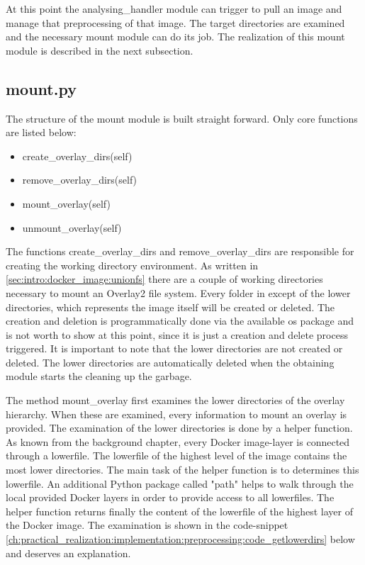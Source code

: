 

At this point the analysing\_handler module can trigger to pull an image and manage that preprocessing of that image. The target directories are examined and the necessary mount module can do its job. The realization of this mount module is described in the next subsection.	

\subsection{mount.py}	
\label{ch:practical_realization:implementation:mount}
The structure of the mount module is built straight forward. Only core functions are listed below:
\begin{itemize}
\item create\_overlay\_dirs(self)
\item remove\_overlay\_dirs(self)
\item mount\_overlay(self)
\item unmount\_overlay(self)
\end{itemize}
The functions create\_overlay\_dirs and remove\_overlay\_dirs are responsible for creating the working directory environment. As written in \ref{sec:intro:docker_image:unionfs} there are a couple of working directories necessary to mount an Overlay2 file system.
Every folder in except of the lower directories, which represents the image itself will be created or deleted. The creation and deletion is programmatically done via the available os package and is not worth to show at this point, since it is just a creation and delete process triggered. It is important to note that the lower directories are not created or deleted. The lower directories are automatically deleted when the obtaining module starts the cleaning up the garbage.
 
The method mount\_overlay first examines the lower directories of the overlay hierarchy. When these are examined, every information to mount an overlay is provided.
The examination of the lower directories is done by a helper function.
As known from the background chapter, every Docker image-layer is connected through a lowerfile.
The lowerfile of the highest level of the image contains the most lower directories. 
The main task of the helper function is to determines this lowerfile.
An additional Python package called "path" helps to walk through the local provided Docker layers in order to provide access to all lowerfiles. The helper function returns finally the content of the lowerfile of the highest layer of the Docker image.
The examination is shown in the code-snippet \ref{ch:practical_realization:implementation:preprocessing:code_getlowerdirs} below and deserves an explanation.

